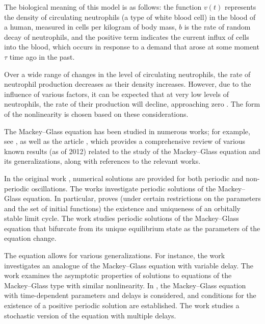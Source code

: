 The biological meaning of this model is as follows: the function $v(t)$ represents the density of circulating neutrophils (a type of white blood cell) in the blood of a human, measured in cells per kilogram of body mass, $b$ is the rate of random decay of neutrophils, and the positive term indicates the current influx of cells into the blood, which occurs in response to a demand that arose at some moment $\tau$ time ago in the past.

Over a wide range of changes in the level of circulating neutrophils, the rate of neutrophil production decreases as their density increases. However, due to the influence of various factors, it can be expected that at very low levels of neutrophils, the rate of their production will decline, approaching zero \cite[p. 85]{Mackey1977}. The form of the nonlinearity is chosen based on these considerations.

The Mackey--Glass equation has been studied in numerous works; for example, see \cite{Junges2012, Su2011, Wu2007, Kubyshkin2016, Krisztin2020, Bartha2021}, as well as the article \cite{Berezansky2012}, which provides a comprehensive review of various known results (as of 2012) related to the study of the Mackey--Glass equation and its generalizations, along with references to the relevant works.

In the original work \cite{Mackey1977}, numerical solutions are provided for both periodic and non-periodic oscillations. The works \cite{Krisztin2020, Bartha2021} investigate periodic solutions of the Mackey--Glass equation. In particular, \cite{Bartha2021} proves (under certain restrictions on the parameters and the set of initial functions) the existence and uniqueness of an orbitally stable limit cycle. The work \cite{Kubyshkin2016} studies periodic solutions of the Mackey--Glass equation that bifurcate from its unique equilibrium state as the parameters of the equation change.

The equation allows for various generalizations. For instance, the work \cite{Berezansky2006} investigates an analogue of the Mackey--Glass equation with variable delay. The work \cite{Liz2002} examines the asymptotic properties of solutions to equations of the Mackey--Glass type with similar nonlinearity. In \cite{Wu2007}, the Mackey--Glass equation with time-dependent parameters and delays is considered, and conditions for the existence of a positive periodic solution are established. The work \cite{Huang2024} studies a stochastic version of the equation with multiple delays.


